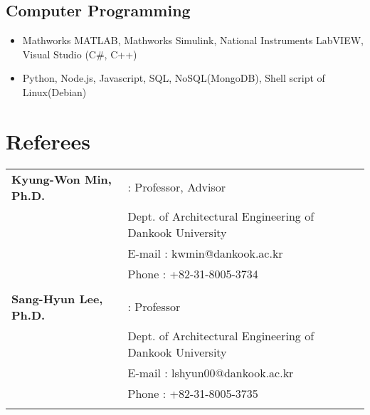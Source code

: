 \subsection*{Computer Programming}
\begin{itemize}
  \item Mathworks MATLAB, Mathworks Simulink, National Instruments LabVIEW, Visual Studio (C\#, C++)
  \item Python, Node.js, Javascript, SQL, NoSQL(MongoDB), Shell script of Linux(Debian)
\end{itemize}

\section*{Referees}
\begin{tabularx}{\textwidth}{p{}X}
    \textbf{Kyung-Won Min, Ph.D.} & : Professor, Advisor \\
    & Dept. of Architectural Engineering of Dankook University \\
    & E-mail : kwmin@dankook.ac.kr \\
    & Phone : +82-31-8005-3734 \\
    \\
    \textbf{Sang-Hyun Lee, Ph.D.} & : Professor \\
    & Dept. of Architectural Engineering of Dankook University \\
    & E-mail : lshyun00@dankook.ac.kr \\
    & Phone : +82-31-8005-3735 \\
    \\
\end{tabularx}
